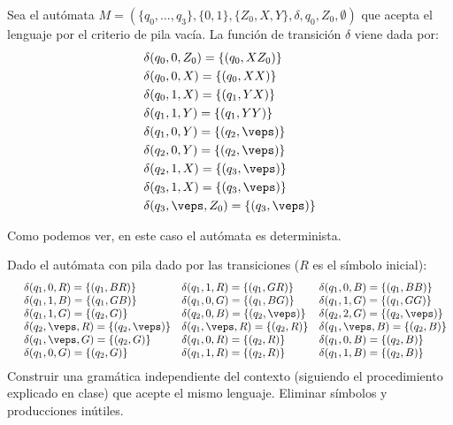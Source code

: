 \begin{ejercicio}
\begin{enumerate}
        Sea el autómata $M = (\{q_0,\ldots,q_3\},\{0,1\},\{Z_0,X,Y\},\delta,q_0,Z_0,\emptyset)$ que acepta el lenguaje por el criterio de pila vacía. La función de transición $\delta$ viene dada por:
        \begin{align*}
            &\delta(q_0,0,Z_0) = \{(q_0,XZ_0)\} \\
            &\delta(q_0,0,X) = \{(q_0,XX)\} \\
            &\delta(q_0,1,X) = \{(q_1,YX)\} \\
            &\delta(q_1,1,Y) = \{(q_1,YY)\} \\
            &\delta(q_1,0,Y) = \{(q_2,\veps)\} \\
            &\delta(q_2,0,Y) = \{(q_2,\veps)\} \\
            &\delta(q_2,1,X) = \{(q_3,\veps)\} \\
            &\delta(q_3,1,X) = \{(q_3,\veps)\} \\
            &\delta(q_3,\veps,Z_0) = \{(q_3,\veps)\}
        \end{align*}

        Como podemos ver, en este caso el autómata es determinista.
    \end{enumerate}
\end{ejercicio}

\begin{ejercicio}\label{ej:1.5.19}
    Dado el autómata con pila dado por las transiciones ($R$ es el símbolo inicial):
    \begin{equation*}
        \begin{array}{llll}
            &\delta(q_1,0,R) = \{(q_1,BR)\} &\delta(q_1,1,R) = \{(q_1,GR)\} &\delta(q_1,0,B) = \{(q_1,BB)\} \\
            &\delta(q_1,1,B) = \{(q_1,GB)\} &\delta(q_1,0,G) = \{(q_1,BG)\} &\delta(q_1,1,G) = \{(q_1,GG)\} \\
            &\delta(q_1,1,G) = \{(q_2,G)\} &\delta(q_2,0,B) = \{(q_2,\veps)\} &\delta(q_2,2,G) = \{(q_2,\veps)\} \\
            &\delta(q_2,\veps,R) = \{(q_2,\veps)\} &\delta(q_1,\veps,R) = \{(q_2,R)\} &\delta(q_1,\veps,B) = \{(q_2,B)\} \\
            &\delta(q_1,\veps,G) = \{(q_2,G)\} &\delta(q_1,0,R) = \{(q_2,R)\} &\delta(q_1,0,B) = \{(q_2,B)\} \\
            &\delta(q_1,0,G) = \{(q_2,G)\} &\delta(q_1,1,R) = \{(q_2,R)\} &\delta(q_1,1,B) = \{(q_2,B)\} 
        \end{array}
    \end{equation*}
    Construir una gramática independiente del contexto (siguiendo el procedimiento explicado en clase) que acepte el mismo lenguaje. Eliminar símbolos y producciones inútiles.

\end{ejercicio}

